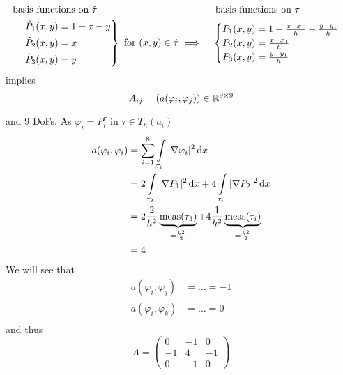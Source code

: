 \begin{example}
	
	
	\begin{align*}
		&\text{basis functions on } \hat{\tau} &&  \text{ basis functions on } \tau\\
		&\begin{rcases}
		&\hat{P}_1(x,y)=1-x-y \\
		&\hat{P}_2(x,y)=x \\
		&\hat{P}_3(x,y)=y \\
		\end{rcases}  \text{ for } (x,y) \in \hat{\tau} \implies &&
		\begin{cases}
		P_1(x,y) = 1- \frac{x-x_1}{h} - \frac{y-y_1}{h} \\
		P_2(x,y) = \frac{x-x_1}{h} \\
		P_3(x,y) = \frac{y-y_1}{h} \\
		\end{cases}
	\end{align*}
	implies 
	\begin{equation*}
		A_{ij} =(a(\varphi_i, \varphi_j)) \in \mathbb{R}^{9 \times 9} 
	\end{equation*}
	
	
	
	and 9 DoFs. As $\varphi_i = P^\tau_i$ in $\tau \in T_h(a_i)$
	\begin{align*}
		a(\varphi_i, \varphi_i) &= \displaystyle \sum^8_{i=1} \int \limits_{\tau_i} |\nabla \varphi_i|^2 \mathop{}\!\mathrm{d} x\\
		&= 2 \int \limits_{\tau_3 } |\nabla P_1|^2 \mathop{}\!\mathrm{d} x + 4 \int \limits_{\tau_i} |\nabla P_2|^2 \mathop{}\!\mathrm{d} x\\
		&= 2 \frac{2}{h^2} \underbrace{\text{meas}(\tau_3)}_{=\frac{h^2}{2}}  +4 \frac{1}{h^2} \underbrace{\text{meas}(\tau_i)}_{=\frac{h^2}{2}}\\
		&=4
	\end{align*}
	 We will see that
	 \begin{align*}
	 	a(\varphi_i,\varphi_j) &= \dots = -1\\
	 	a(\varphi_i,\varphi_k) &= \dots = 0\\
	 \end{align*}
	 and thus 
	 \begin{equation*}
	 	A = \begin{pmatrix}
	 	0&-1&0\\
	 	-1&4&-1\\
	 	0&-1&0
	 	\end{pmatrix}
	 \end{equation*}
	
\end{example}



